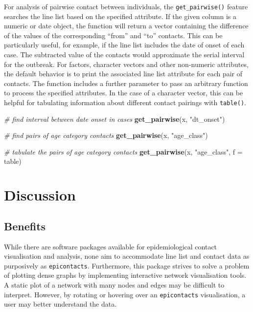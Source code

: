 \documentclass[9pt,a4paper,]{extarticle}
\newenvironment{Shaded}{\begin{snugshade}}{\end{snugshade}}
\newcommand{\KeywordTok}[1]{\textcolor[rgb]{0.13,0.29,0.53}{\textbf{#1}}}
\newcommand{\DataTypeTok}[1]{\textcolor[rgb]{0.13,0.29,0.53}{#1}}
\newcommand{\StringTok}[1]{\textcolor[rgb]{0.31,0.60,0.02}{#1}}
\newcommand{\CommentTok}[1]{\textcolor[rgb]{0.56,0.35,0.01}{\textit{#1}}}
\newcommand{\NormalTok}[1]{#1}
\theoremstyle{definition}
\theoremstyle{definition}
\theoremstyle{definition}
\theoremstyle{remark}
\begin{document}
For analysis of pairwise contact between individuals, the \texttt{get\_pairwise()} feature searches the line list based on the specified attribute. If the given column is a numeric or date object, the function will return a vector containing the difference of the values of the corresponding ``from'' and ``to'' contacts. This can be particularly useful, for example, if the line list includes the date of onset of each case. The subtracted value of the contacts would approximate the serial interval for the outbreak\citep{fine:2003}. For factors, character vectors and other non-numeric attributes, the default behavior is to print the associated line list attribute for each pair of contacts. The function includes a further parameter to pass an arbitrary function to process the specified attributes. In the case of a character vector, this can be helpful for tabulating information about different contact pairings with \texttt{table()}.

\begin{Shaded}
\begin{Highlighting}[]
\CommentTok{# find interval between date onset in cases}
\KeywordTok{get_pairwise}\NormalTok{(x, }\StringTok{"dt_onset"}\NormalTok{)}

\CommentTok{# find pairs of age category contacts}
\KeywordTok{get_pairwise}\NormalTok{(x, }\StringTok{"age_class"}\NormalTok{)}

\CommentTok{# tabulate the pairs of age category contacts}
\KeywordTok{get_pairwise}\NormalTok{(x, }\StringTok{"age_class"}\NormalTok{, }\DataTypeTok{f =}\NormalTok{ table)}
\end{Highlighting}
\end{Shaded}

\section{Discussion}\label{discussion}

\subsection{Benefits}\label{benefits}

While there are software packages available for epidemiological contact visualisation and analysis, none aim to accommodate line list and contact data as purposively as \texttt{epicontacts}\citep{noremark:2014}\citep{carroll:2014}\citep{guthrie:2017}. Furthermore, this package strives to solve a problem of plotting dense graphs by implementing interactive network visualisation tools. A static plot of a network with many nodes and edges may be difficult to interpret. However, by rotating or hovering over an \texttt{epicontacts} visualisation, a user may better understand the data.
\end{document}
